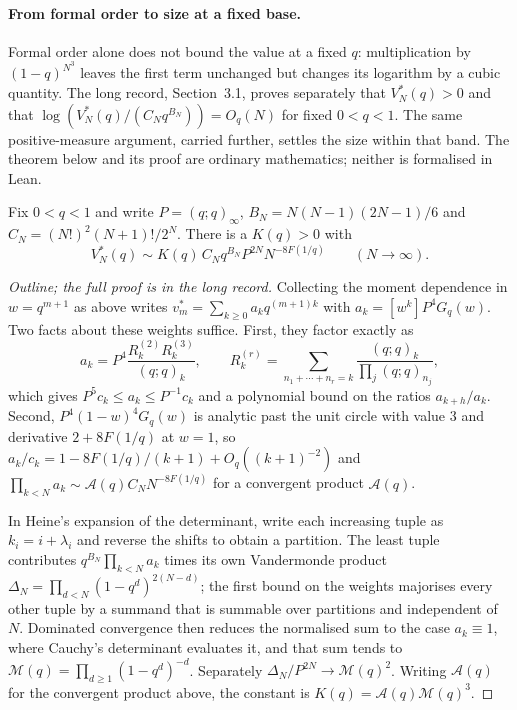 \documentclass[11pt]{article}
\begin{document}
\paragraph{From formal order to size at a fixed base.}
Formal order alone does not bound the value at a fixed $q$: multiplication
by $(1-q)^{N^3}$ leaves the first term unchanged but changes its logarithm
by a cubic quantity. The long record, Section~3.1, proves separately that
$V_N^*(q)>0$ and that $\log(V_N^*(q)/(C_Nq^{B_N}))=O_q(N)$ for fixed
$0<q<1$. The same positive-measure argument, carried further, settles the
size within that band. The theorem below and its proof are ordinary
mathematics; neither is formalised in Lean.

\begin{theorem}\label{res:sharp-fixed-base}
Fix $0<q<1$ and write $P=(q;q)_\infty$, $B_N=N(N-1)(2N-1)/6$ and
$C_N=(N!)^2(N+1)!/2^N$. There is a $K(q)>0$ with
\[
 V_N^*(q)\sim K(q)\,C_Nq^{B_N}P^{2N}N^{-8F(1/q)}
 \qquad(N\to\infty).
\]
\end{theorem}

\begin{proof}[Outline; the full proof is in the long record]
Collecting the moment dependence in $w=q^{m+1}$ as above writes
$v_m^*=\sum_{k\ge0}a_kq^{(m+1)k}$ with $a_k=[w^k]P^4G_q(w)$. Two facts about
these weights suffice. First, they factor exactly as
\[
 a_k=P^4\frac{R_k^{(2)}R_k^{(3)}}{(q;q)_k},
 \qquad
 R_k^{(r)}=\sum_{n_1+\cdots+n_r=k}\frac{(q;q)_k}{\prod_j(q;q)_{n_j}},
\]
which gives $P^5c_k\le a_k\le P^{-1}c_k$ and a polynomial bound on the ratios
$a_{k+h}/a_k$. Second, $P^4(1-w)^4G_q(w)$ is analytic past the unit circle with
value $3$ and derivative $2+8F(1/q)$ at $w=1$, so
$a_k/c_k=1-8F(1/q)/(k+1)+O_q((k+1)^{-2})$ and
$\prod_{k<N}a_k\sim\mathcal A(q)C_NN^{-8F(1/q)}$ for a convergent product
$\mathcal A(q)$.

In Heine's expansion of the determinant, write each increasing tuple as
$k_i=i+\lambda_i$ and reverse the shifts to obtain a partition. The least tuple
contributes $q^{B_N}\prod_{k<N}a_k$ times its own Vandermonde product
$\Delta_N=\prod_{d<N}(1-q^d)^{2(N-d)}$; the first bound on the weights
majorises every other tuple by a summand that is summable over partitions and
independent of $N$. Dominated convergence then reduces the normalised sum to
the case $a_k\equiv1$, where Cauchy's determinant evaluates it, and that sum
tends to $\mathcal M(q)=\prod_{d\ge1}(1-q^d)^{-d}$. Separately
$\Delta_N/P^{2N}\to\mathcal M(q)^2$. Writing $\mathcal A(q)$ for the
convergent product above, the constant is
$K(q)=\mathcal A(q)\mathcal M(q)^3$.
\end{proof}
\end{document}
